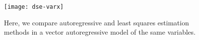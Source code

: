 \begin{figure}[tb]
  \centering
  \texttt{[image: dse-varx]}
  \caption[Comparing Autoregressive and Least Squares Estimation]{Here, we compare autoregressive and least squares estimation methods in a vector autoregressive model of the same variables.}
  \label{figure:dse-varx}
\end{figure}


